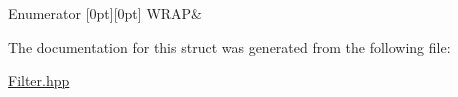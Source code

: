 \begin{DoxyEnumFields}{Enumerator}
[0pt][0pt]{}\mbox{\label{struct_num_c_1_1_filter_1_1_boundary_a20ccfbf059139a99eda623c1550a27e3aadb5556dd62e6ac40b2fd9c508476e83}} 
W\+R\+AP&\\
\hline

\end{DoxyEnumFields}


The documentation for this struct was generated from the following file\+:\begin{DoxyCompactItemize}
\item 
\mbox{\hyperlink{_filter_8hpp}{Filter.\+hpp}}\end{DoxyCompactItemize}
